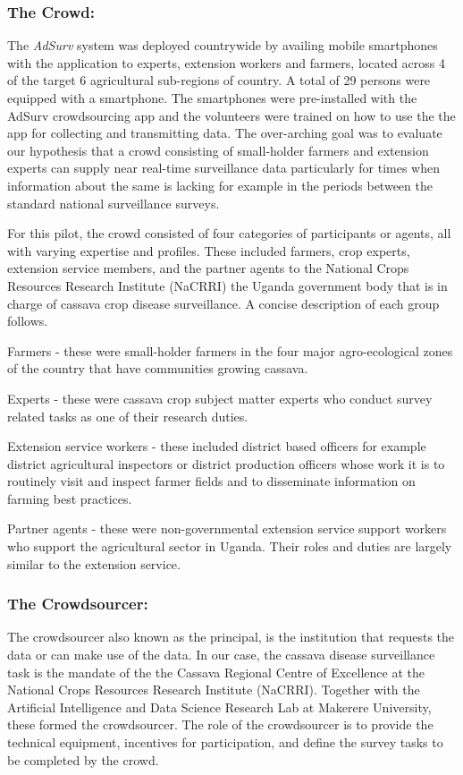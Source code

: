 \documentclass[letterpaper]{article} %
\begin{document}
\subsubsection{The Crowd:}
The \emph{AdSurv} system was deployed countrywide by availing mobile smartphones with the application to experts, extension workers and farmers, located across 4 of the target 6 agricultural sub-regions of country. A total of 29 persons were equipped with a smartphone.  The smartphones were pre-installed with the AdSurv crowdsourcing app and the volunteers were trained on how to use the the app for collecting and transmitting data. The over-arching goal was to evaluate our hypothesis that a crowd consisting of small-holder farmers and extension experts can supply near real-time surveillance data particularly for times when information about the same is lacking for example in the periods between the standard national surveillance surveys.

For this pilot, the crowd consisted of four categories of participants or agents, all with varying expertise and profiles. These included farmers, crop experts, extension service members, and the partner agents to the National Crops Resources Research Institute (NaCRRI) the Uganda government body that is in charge of cassava crop disease surveillance. A concise description of each group follows.
\item Farmers - these were small-holder farmers in the four major agro-ecological zones of the country that have communities growing cassava.
\item Experts - these were cassava crop subject matter experts who conduct survey related tasks as one of their research duties.
\item Extension service workers - these included district based officers for example district agricultural inspectors or district production officers whose work it is to routinely visit and inspect farmer fields and to disseminate information on farming best practices.
\item Partner agents - these were non-governmental extension service support workers who support the agricultural sector in Uganda. Their roles and duties are largely similar to the extension service.

\subsubsection{The Crowdsourcer:}
The crowdsourcer also known as the principal, is the institution that requests the data or can make use of the data. In our case, the cassava disease surveillance task is the mandate of the the Cassava Regional Centre of Excellence at the National Crops Resources Research Institute (NaCRRI). Together with the Artificial Intelligence and Data Science Research Lab at Makerere University, these formed the crowdsourcer. The role of the crowdsourcer is to provide the technical equipment, incentives for participation, and define the survey tasks to be completed by the crowd.
\end{document}
